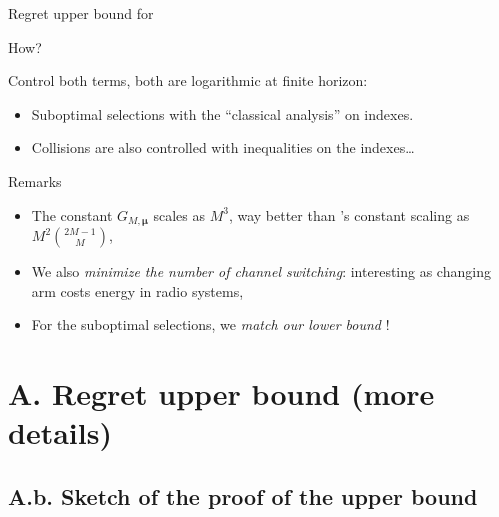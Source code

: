 \documentclass[12pt,english,ignorenonframetext,]{beamer}
\providecommand{\tightlist}{%
  \setlength{\itemsep}{0pt}\setlength{\parskip}{0pt}}
\begin{document}
\begin{frame}{Regret upper bound for \MCTopM{}}

\begin{block}{How?}

Control both terms, both are logarithmic at finite horizon:

\begin{itemize}\tightlist
\item
  Suboptimal selections with the ``classical analysis'' on \klUCB{}
  indexes.
\item
  Collisions are also controlled with inequalities on the \klUCB{} indexes\ldots{}
\end{itemize}

\end{block}

\pause

\begin{block}{Remarks}

\begin{itemize}\tightlist
\item
  The constant \(G_{M,\boldsymbol{\mu}}\) scales as \(M^3\), way better
  than \rhoRand's constant scaling as \(M^2 {2M-1 \choose M}\),
\item
  We also \emph{minimize the number of channel switching}: interesting
  as changing arm costs energy in radio systems,
\item
  For the suboptimal selections, we \emph{match our lower bound} !
\end{itemize}

\end{block}

\end{frame}\section{\hfill{}A. Regret upper bound (more details)\hfill{}}

\subsection{\hfill{}A.b. Sketch of the proof of the upper bound\hfill{}}
\end{document}
